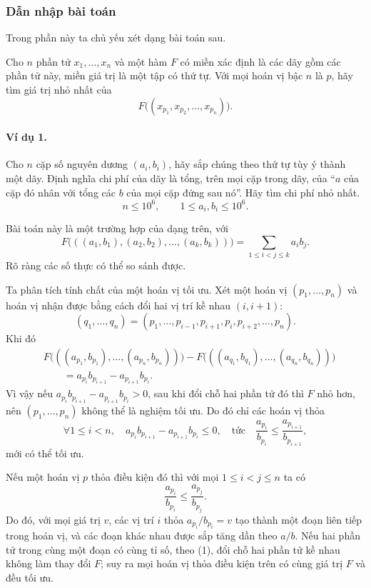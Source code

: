 \documentclass[11pt]{article}
\begin{document}
\subsubsection{Dẫn nhập bài toán}

Trong phần này ta chủ yếu xét dạng bài toán sau.

Cho $n$ phần tử $x_1,\ldots,x_n$ và một hàm $F$ có miền xác định là các dãy gồm
các phần tử này, miền giá trị là một tập có thứ tự. Với mọi hoán vị bậc $n$ là
$p$, hãy tìm giá trị nhỏ nhất của
\[
  F\bigl((x_{p_1},x_{p_2},\ldots,x_{p_n})\bigr).
\]

\paragraph{Ví dụ 1.}
Cho $n$ cặp số nguyên dương $(a_i,b_i)$, hãy sắp chúng theo thứ tự tùy ý thành
một dãy. Định nghĩa chi phí của dãy là tổng, trên mọi cặp trong dãy, của
``$a$ của cặp đó nhân với tổng các $b$ của mọi cặp đứng sau nó''. Hãy tìm chi
phí nhỏ nhất.
\[
  n\le 10^6,\qquad 1\le a_i,b_i\le 10^6.
\]

Bài toán này là một trường hợp của dạng trên, với
\[
  F\bigl(((a_1,b_1),(a_2,b_2),\ldots,(a_k,b_k))\bigr)
  =\sum_{1\le i<j\le k} a_i b_j .
\]
Rõ ràng các số thực có thể so sánh được.

Ta phân tích tính chất của một hoán vị tối ưu. Xét một hoán vị
$(p_1,\ldots,p_n)$ và hoán vị nhận được bằng cách đổi hai vị trí kề nhau
$(i,i+1)$:
\[
  (q_1,\ldots,q_n)=(p_1,\ldots,p_{i-1},p_{i+1},p_i,p_{i+2},\ldots,p_n).
\]
Khi đó
\[
\begin{aligned}
&F\bigl(((a_{p_1},b_{p_1}),\ldots,(a_{p_n},b_{p_n}))\bigr)
 -F\bigl(((a_{q_1},b_{q_1}),\ldots,(a_{q_n},b_{q_n}))\bigr)\\
&\qquad =a_{p_i}b_{p_{i+1}}-a_{p_{i+1}}b_{p_i}.
\end{aligned}
\tag{1}
\]
Vì vậy nếu $a_{p_i}b_{p_{i+1}}-a_{p_{i+1}}b_{p_i}>0$, sau khi đổi chỗ hai phần
tử đó thì $F$ nhỏ hơn, nên $(p_1,\ldots,p_n)$ không thể là nghiệm tối ưu. Do đó
chỉ các hoán vị thỏa
\[
  \forall 1\le i<n,\quad
  a_{p_i}b_{p_{i+1}}-a_{p_{i+1}}b_{p_i}\le 0,
  \quad\text{tức}\quad
  \frac{a_{p_i}}{b_{p_i}}\le \frac{a_{p_{i+1}}}{b_{p_{i+1}}},
\]
mới có thể tối ưu.

Nếu một hoán vị $p$ thỏa điều kiện đó thì với mọi $1\le i<j\le n$ ta có
\[
  \frac{a_{p_i}}{b_{p_i}}\le \frac{a_{p_j}}{b_{p_j}}.
\]
Do đó, với mọi giá trị $v$, các vị trí $i$ thỏa
$a_{p_i}/b_{p_i}=v$ tạo thành một đoạn liên tiếp trong hoán vị, và các đoạn
khác nhau được sắp tăng dần theo $a/b$. Nếu hai phần tử trong cùng một đoạn có
cùng tỉ số, theo (1), đổi chỗ hai phần tử kề nhau không làm thay đổi $F$; suy ra
mọi hoán vị thỏa điều kiện trên có cùng giá trị $F$ và đều tối ưu.
\end{document}
